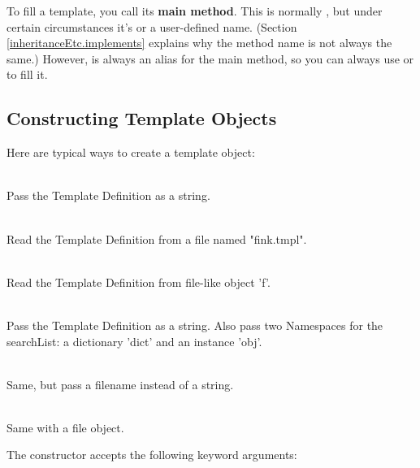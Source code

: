 To fill a template, you call its {\bf main method}.  This is normally 
, but under certain circumstances it's  or
a user-defined name.  (Section \ref{inheritanceEtc.implements} explains why
the method name is not always the same.)  However,  is
always an alias for the main method, so you can always use
 or  to fill it.


\subsection{Constructing Template Objects}
\label{howWorks.constructing}

Here are typical ways to create a template object:
\begin{description}
\item{}
     \\ Pass the Template Definition as a string.
\item{}
     \\ Read the Template Definition from a file named "fink.tmpl".  
\item{}
     \\ Read the Template Definition from file-like object 'f'.
\item{}
     \\ Pass the Template Definition as a string.  Also pass two Namespaces for
     the searchList: a dictionary 'dict' and an instance 'obj'.
\item{}
     \\ Same, but pass a filename instead of a string.
\item{}
     \\ Same with a file object.
\end{description}

The constructor accepts the following keyword arguments:

